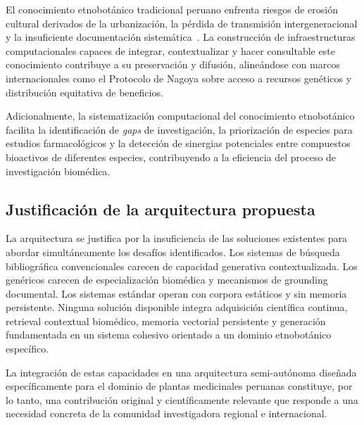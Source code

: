 El conocimiento etnobotánico tradicional peruano enfrenta riesgos de erosión cultural derivados de la urbanización, la pérdida de transmisión intergeneracional y la insuficiente documentación sistemática~\cite{heinrich2020ethnopharmacology}. La construcción de infraestructuras computacionales capaces de integrar, contextualizar y hacer consultable este conocimiento contribuye a su preservación y difusión, alineándose con marcos internacionales como el Protocolo de Nagoya sobre acceso a recursos genéticos y distribución equitativa de beneficios.

Adicionalmente, la sistematización computacional del conocimiento etnobotánico facilita la identificación de \textit{gaps} de investigación, la priorización de especies para estudios farmacológicos y la detección de sinergias potenciales entre compuestos bioactivos de diferentes especies, contribuyendo a la eficiencia del proceso de investigación biomédica.

\subsection{Justificación de la arquitectura propuesta}
\label{subsec:architecture_justification}

La arquitectura \sirca{} se justifica por la insuficiencia de las soluciones existentes para abordar simultáneamente los desafíos identificados. Los sistemas de búsqueda bibliográfica convencionales carecen de capacidad generativa contextualizada. Los \llms{} genéricos carecen de especialización biomédica y mecanismos de grounding documental. Los sistemas \rag{} estándar operan con corpora estáticos y sin memoria persistente. Ninguna solución disponible integra adquisición científica continua, retrieval contextual biomédico, memoria vectorial persistente y generación fundamentada en un sistema cohesivo orientado a un dominio etnobotánico específico.

La integración de estas capacidades en una arquitectura semi-autónoma diseñada específicamente para el dominio de plantas medicinales peruanas constituye, por lo tanto, una contribución original y científicamente relevante que responde a una necesidad concreta de la comunidad investigadora regional e internacional.
